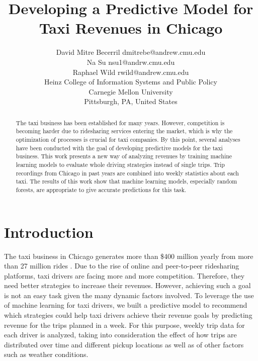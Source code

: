 \documentclass[twoside,11pt]{article}
\begin{document}
\title{Developing a Predictive Model for Taxi Revenues in Chicago}

\author{\name David Mitre Becerril \email dmitrebe@andrew.cmu.edu\\
        \name Na Su \email nsu1@andrw.cmu.edu\\
        \name Raphael Wild \email rwild@andrew.cmu.edu\\
       \addr Heinz College of Information Systems and Public Policy\\
       Carnegie Mellon University\\
       Pittsburgh, PA, United States}

\maketitle

\begin{abstract}
  The taxi business has been established for many years. However, competition is becoming harder due to ridesharing services entering the market, which is why the optimization of processes is crucial for taxi companies. By this point, several analyses have been conducted with the goal of developing predictive models for the taxi business. This work presents a new way of analyzing revenues by training machine learning models to evaluate whole driving strategies instead of single trips. Trip recordings from Chicago in past years are combined into weekly statistics about each taxi. The results of this work show that machine learning models, especially random forests, are appropriate to give accurate predictions for this task.
\end{abstract}

\section{Introduction}

The taxi business in Chicago generates more than \$400 million yearly from more than 27 million rides \citep{rates}. Due to the rise of online and peer-to-peer ridesharing platforms, taxi drivers are facing more and more competition. Therefore, they need better strategies to increase their revenues. However, achieving such a goal is not an easy task given the many dynamic factors involved. To leverage the use of machine learning for taxi drivers, we built a predictive model to recommend which strategies could help taxi drivers achieve their revenue goals by predicting revenue for the trips planned in a week. For this purpose, weekly trip data for each driver is analyzed, taking into consideration the effect of how trips are distributed over time and different pickup locations as well as of other factors such as weather conditions.
\end{document}
